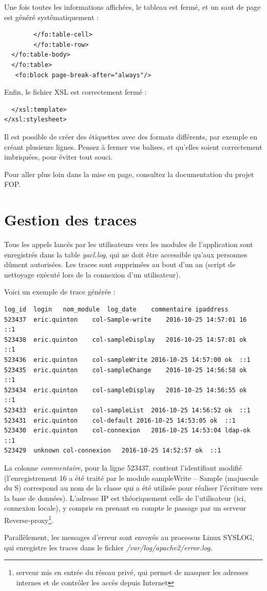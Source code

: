 Une fois toutes les informations affichées, le tableau est fermé, et un saut de page est généré systématiquement :
\begin{lstlisting}
  		</fo:table-cell>
  	  	</fo:table-row>
  </fo:table-body>
  </fo:table>
   <fo:block page-break-after="always"/>
\end{lstlisting}

Enfin, le fichier XSL est correctement fermé :
\begin{lstlisting}
  </xsl:template>
</xsl:stylesheet>
\end{lstlisting}

Il est possible de créer des étiquettes avec des formats différents, par exemple en créant plusieurs lignes. Pensez à fermer vos balises, et qu'elles soient correctement imbriquées, pour éviter tout souci.

Pour aller plus loin dans la mise en page, consultez la documentation du projet FOP.

\section{Gestion des traces}

Tous les appels lancés par les utilisateurs vers les modules de l'application sont enregistrés dans la table \textit{gacl.log}, qui ne doit être accessible qu'aux personnes dûment autorisées. Les traces sont supprimées au bout d'un an (script de nettoyage exécuté lors de la connexion d'un utilisateur).

Voici un exemple de trace générée :
\begin{lstlisting}
log_id	login	nom_module	log_date	commentaire	ipaddress
523437	eric.quinton	col-Sample-write	2016-10-25 14:57:01	16	::1
523438	eric.quinton	col-sampleDisplay	2016-10-25 14:57:01	ok	::1
523436	eric.quinton	col-sampleWrite	2016-10-25 14:57:00	ok	::1
523435	eric.quinton	col-sampleChange	2016-10-25 14:56:58	ok	::1
523434	eric.quinton	col-sampleDisplay	2016-10-25 14:56:55	ok	::1
523433	eric.quinton	col-sampleList	2016-10-25 14:56:52	ok	::1
523431	eric.quinton	col-default	2016-10-25 14:53:05	ok	::1
523430	eric.quinton	col-connexion	2016-10-25 14:53:04	ldap-ok	::1
523429	unknown	col-connexion	2016-10-25 14:52:57	ok	::1
\end{lstlisting}

La colonne \textit{commentaire}, pour la ligne 523437, contient l'identifiant modifié (l'enregistrement 16 a été traité par le module sampleWrite -- Sample (majuscule du S) correspond au nom de la classe qui a été utilisée pour réaliser l'écriture vers la base de données). L'adresse IP est théoriquement celle de l'utilisateur (ici, connexion locale), y compris en prenant en compte le passage par un serveur Reverse-proxy\footnote{serveur mis en entrée du réseau privé, qui permet de masquer les adresses internes et de contrôler les accès depuis Internet}.

Parallèlement, les messages d'erreur sont envoyés au processus Linux SYSLOG, qui enregistre les traces dans le fichier \textit{/var/log/apache2/error.log}.